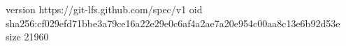 version https://git-lfs.github.com/spec/v1
oid sha256:cf029efd71bbe3a79ce16a22e29e0c6af4a2ae7a20e954c00aa8c13e6b92d53e
size 21960
